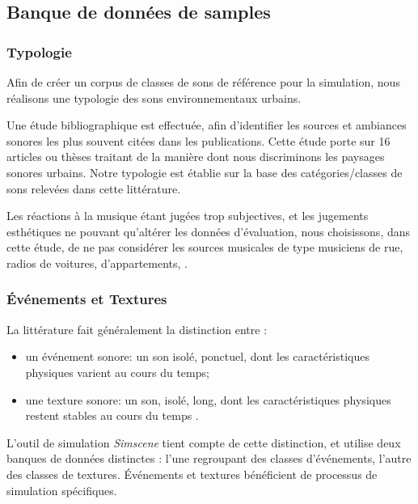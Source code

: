 \documentclass[twoside,twocolumn]{article}
\begin{document}
\subsection{Banque de données de samples}
\label{sec:simscene_sampleDataSet}

\subsubsection*{Typologie}

Afin de créer un corpus de classes de sons de référence pour la simulation, nous réalisons une typologie des sons environnementaux urbains.

Une étude bibliographique est effectuée, afin d'identifier les sources et ambiances sonores les plus souvent citées dans les publications. Cette étude porte sur 16 articles ou thèses \cite{maffiolo_caracterisation_1999,raimbault2002simulation,guastavino_etude_2003,defreville2004aactivity,raimbault2005urban,dubois2006cognitive,devergie_relations_2006,guastavino2006ideal,niessen2010categories,maffiolo_caracterisation_1999,beaumont2004pertinence,polack2008perceptive,leobon_analyse_1986,brown2011towards}
traitant de la manière dont nous discriminons les paysages sonores urbains. Notre typologie est établie sur la base des catégories/classes de sons relevées dans cette littérature.

Les réactions à la musique étant jugées trop subjectives, et les jugements esthétiques ne pouvant qu'altérer les données d'évaluation, nous choisissons, dans cette étude, de ne pas considérer les sources musicales de type musiciens de rue, radios de voitures, d'appartements, \etc.

\subsubsection*{Événements et Textures}

La littérature fait généralement la distinction entre :

\begin{itemize}
\item {un événement sonore}: un son isolé, ponctuel, dont les caractéristiques physiques varient au cours du temps;
\item {une texture sonore}: un son, isolé, long, dont les caractéristiques physiques restent stables au cours du temps \cite{saint1995classification}.
\end{itemize}

L'outil de simulation \emph{Simscene} tient compte de cette distinction, et utilise deux banques de données distinctes : l'une regroupant des classes d’événements, l'autre des classes de textures. Événements et textures bénéficient de processus de simulation spécifiques.
\end{document}
